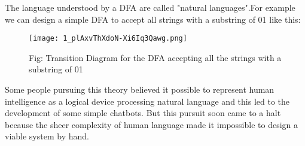 \documentclass{article}
\begin{document}
The language understood by a DFA are called "natural languages".For example we can design a simple DFA to accept all strings with a substring of 01 like this:
\begin{figure}[H]
	\texttt{[image: 1\_plAxvThXdoN-Xi6Iq3Qawg.png]}
	\caption{Fig: Transition Diagram for the DFA accepting all the strings with a substring of 01}
	\label{fig:DFA}
\end{figure}

Some people pursuing this theory believed it possible to represent human intelligence as a logical device processing natural language and this led to the development of some simple chatbots. But this pursuit soon came to a halt because the sheer complexity of human language made it impossible to design a viable system by hand.
\end{document}
